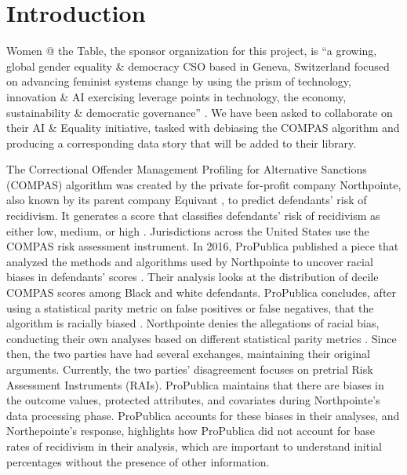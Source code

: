 \documentclass[water,article,submit,moreauthors,pdftex]{mdpi}
\begin{document}

\hypertarget{introduction}{%
\section{Introduction}\label{introduction}}

Women @ the Table, the sponsor organization for this project, is ``a
growing, global gender equality \& democracy CSO based in Geneva,
Switzerland focused on advancing feminist systems change by using the
prism of technology, innovation \& AI exercising leverage points in
technology, the economy, sustainability \& democratic governance''
\citep{noauthor_womenthetable_nodate}. We have been asked to collaborate
on their AI \& Equality \citep{noauthor_ai_nodate} initiative, tasked
with debiasing the COMPAS algorithm
\citep{noauthor_aif360datasetscompasdataset_2018} and producing a
corresponding data story that will be added to their library.

The Correctional Offender Management Profiling for Alternative Sanctions
(COMPAS) algorithm was created by the private for-profit company
Northpointe, also known by its parent company Equivant
\citep{equivant_faq_nodate}, to predict defendants' risk of recidivism.
It generates a score that classifies defendants' risk of recidivism as
either low, medium, or high \citep{angwin2016machine}. Jurisdictions
across the United States use the COMPAS risk assessment instrument. In
2016, ProPublica published a piece that analyzed the methods and
algorithms used by Northpointe to uncover racial biases in defendants'
scores \citep{angwin2016machine}. Their analysis looks at the
distribution of decile COMPAS scores among Black and white defendants.
ProPublica concludes, after using a statistical parity metric on false
positives or false negatives, that the algorithm is racially biased
\citep{larson2016we}. Northpointe denies the allegations of racial bias,
conducting their own analyses based on different statistical parity
metrics \citep{equivant_response_2018}. Since then, the two parties have
had several exchanges, maintaining their original arguments. Currently,
the two parties' disagreement focuses on pretrial Risk Assessment
Instruments (RAIs). ProPublica maintains that there are biases in the
outcome values, protected attributes, and covariates during
Northpointe's data processing phase. ProPublica accounts for these
biases in their analyses, and Northepointe's response, highlights how
ProPublica did not account for base rates of recidivism in their
analysis, which are important to understand initial percentages without
the presence of other information.
\end{document}
